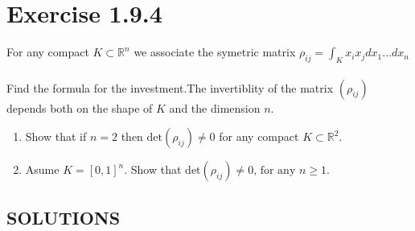 \documentclass{exam}
\begin{document}
\section*{Exercise 1.9.4}
For any compact $K \subset \mathbb{R}^n$ we associate the symetric matrix $\displaystyle \rho_{ij} = \int_{K} x_i x_j d x_1 \dots d x_n$ \\
\\
Find the formula for the investment.The invertiblity of the matrix $(\rho_{ij})$ depends both on the shape of $K$ and the dimension $n$.
\begin{enumerate}
    \item Show that if $n = 2$ then $\text{det}(\rho_{ij}) \neq 0$ for any compact $K \subset \mathbb{R}^2$.
    \item Asume $K = [0,1]^n$. Show that $\text{det}(\rho_{ij}) \neq 0 \text{, for any $n \geq 1$}$.
\end{enumerate}

\newpage

\begin{center}    
    \section*{SOLUTIONS}
\end{center}
\end{document}
